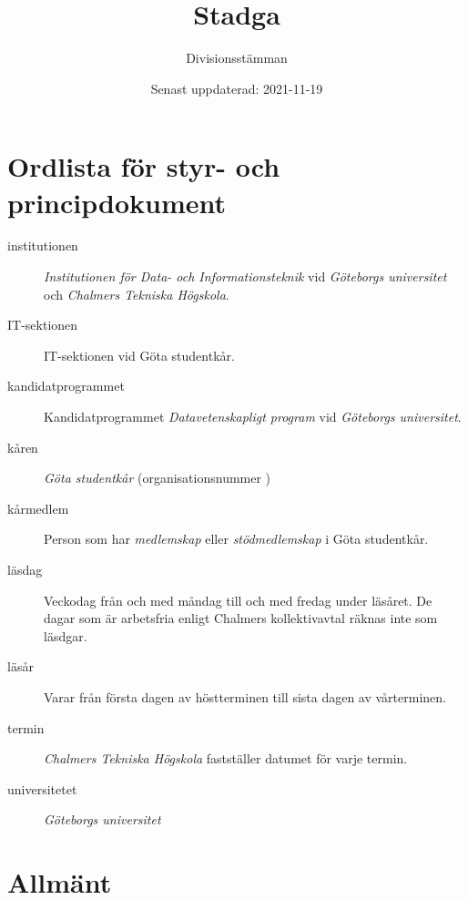 \documentclass{dvd}
\begin{document}
	\title{Stadga}
	\author{Divisionsstämman}
	\date{Senast uppdaterad: 2021-11-19}

        \section{Ordlista för styr- och principdokument}

	\begin{description}
		\item[institutionen] \emph{Institutionen för Data- och Informationsteknik} vid \emph{Göteborgs universitet} och \emph{Chalmers Tekniska Högskola}.

		\item[IT-sektionen] IT-sektionen vid Göta studentkår.

		\item[kandidatprogrammet] Kandidatprogrammet \emph{Datavetenskapligt program} vid \emph{Göteborgs universitet}.

		\item[kåren] \emph{Göta studentkår} (organisationsnummer )

		\item[kårmedlem] Person som har \emph{medlemskap} eller \emph{stödmedlemskap} i Göta studentkår.

		\item[läsdag] Veckodag från och med måndag till och med fredag under läsåret.
					  De dagar som är arbetsfria enligt Chalmers kollektivavtal räknas inte som läsdgar.

		\item[läsår] Varar från första dagen av höstterminen till sista dagen av vårterminen.

		\item[termin] \emph{Chalmers Tekniska Högskola} fastställer datumet för varje termin.

		\item[universitetet] \emph{Göteborgs universitet}
	\end{description}

	\section{Allmänt}
\end{document}
